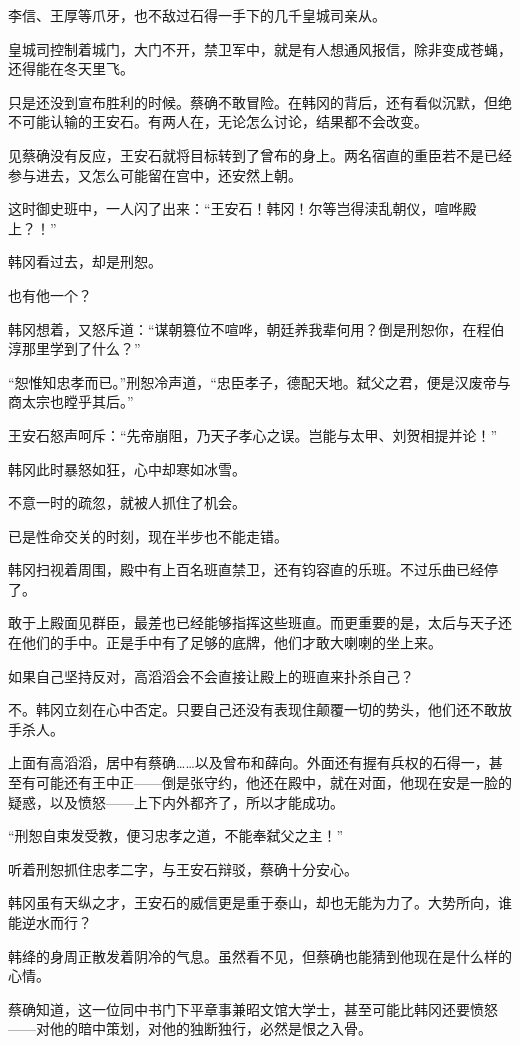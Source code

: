 李信、王厚等爪牙，也不敌过石得一手下的几千皇城司亲从。

皇城司控制着城门，大门不开，禁卫军中，就是有人想通风报信，除非变成苍蝇，还得能在冬天里飞。

只是还没到宣布胜利的时候。蔡确不敢冒险。在韩冈的背后，还有看似沉默，但绝不可能认输的王安石。有两人在，无论怎么讨论，结果都不会改变。

见蔡确没有反应，王安石就将目标转到了曾布的身上。两名宿直的重臣若不是已经参与进去，又怎么可能留在宫中，还安然上朝。

这时御史班中，一人闪了出来：“王安石！韩冈！尔等岂得渎乱朝仪，喧哗殿上？！”

韩冈看过去，却是刑恕。

也有他一个？

韩冈想着，又怒斥道：“谋朝篡位不喧哗，朝廷养我辈何用？倒是刑恕你，在程伯淳那里学到了什么？”

“恕惟知忠孝而已。”刑恕冷声道，“忠臣孝子，德配天地。弑父之君，便是汉废帝与商太宗也瞠乎其后。”

王安石怒声呵斥：“先帝崩阻，乃天子孝心之误。岂能与太甲、刘贺相提并论！”

韩冈此时暴怒如狂，心中却寒如冰雪。

不意一时的疏忽，就被人抓住了机会。

已是性命交关的时刻，现在半步也不能走错。

韩冈扫视着周围，殿中有上百名班直禁卫，还有钧容直的乐班。不过乐曲已经停了。

敢于上殿面见群臣，最差也已经能够指挥这些班直。而更重要的是，太后与天子还在他们的手中。正是手中有了足够的底牌，他们才敢大喇喇的坐上来。

如果自己坚持反对，高滔滔会不会直接让殿上的班直来扑杀自己？

不。韩冈立刻在心中否定。只要自己还没有表现住颠覆一切的势头，他们还不敢放手杀人。

上面有高滔滔，居中有蔡确……以及曾布和薛向。外面还有握有兵权的石得一，甚至有可能还有王中正——倒是张守约，他还在殿中，就在对面，他现在安是一脸的疑惑，以及愤怒——上下内外都齐了，所以才能成功。

“刑恕自束发受教，便习忠孝之道，不能奉弑父之主！”

听着刑恕抓住忠孝二字，与王安石辩驳，蔡确十分安心。

韩冈虽有天纵之才，王安石的威信更是重于泰山，却也无能为力了。大势所向，谁能逆水而行？

韩绛的身周正散发着阴冷的气息。虽然看不见，但蔡确也能猜到他现在是什么样的心情。

蔡确知道，这一位同中书门下平章事兼昭文馆大学士，甚至可能比韩冈还要愤怒——对他的暗中策划，对他的独断独行，必然是恨之入骨。

